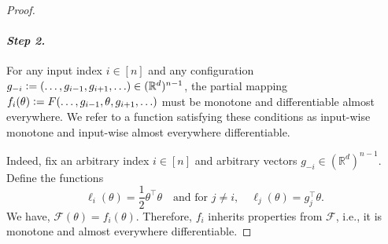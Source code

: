 \documentclass[twoside,11pt]{article}
\newcommand{\R}{\mathbb{R}}
\newcommand{\F}{\mathcal{F}}
\begin{document}
\begin{proof}
    \paragraph{\textit{\textbf{Step 2.}}}
    For any input index $i \in [n]$ and any configuration $g_{-i} \vcentcolon= (\ldots, g_{i-1}, g_{i+1}, \ldots) \in (\R^d)^{n-1}$, the partial mapping $f_i(\theta) \vcentcolon= F(\ldots, g_{i-1}, \theta, g_{i+1}, \ldots)$ must be monotone and differentiable almost everywhere.
    We refer to a function satisfying these conditions as input-wise monotone and input-wise almost everywhere differentiable.

    Indeed, fix an arbitrary index $i\in[n]$ and arbitrary vectors $g_{-i} \in (\R^d)^{n-1}$. 
    Define the functions 
    \[
      \ell_i(\theta) = \frac{1}{2} \theta^\intercal \theta \quad\text{and for } j \neq i,\quad \ell_j(\theta) = g_j^\intercal \theta. 
    \]
    We have, $\F(\theta) = f_i(\theta)$. 
    Therefore, $f_i$ inherits properties from $\F$, i.e., it is monotone and almost everywhere differentiable.


\end{proof}
\end{document}
